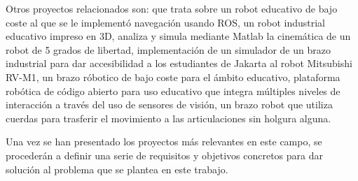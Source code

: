 Otros proyectos relacionados son: \cite{8215317} que trata sobre un robot educativo de bajo coste al que se le implementó navegación usando ROS, 
\cite{vujivcicrealization} un robot industrial educativo impreso en 3D, \cite{Sabri_2021} analiza y simula mediante Matlab la cinemática de un robot 
de 5 grados de libertad, \cite{Prabowo_2019} implementación de un simulador de un brazo industrial para dar accesibilidad a los estudiantes de Jakarta 
al robot Mitsubishi RV-M1, \cite{6235428} un brazo róbotico de bajo coste para el ámbito educativo, \cite{10.1007/978-3-319-62875-2_22} plataforma robótica 
de código abierto para uso educativo que integra múltiples niveles de interacción a través del uso de sensores de visión, \cite{Morgan_2011} un 
brazo robot que utiliza cuerdas para trasferir el movimiento a las articulaciones sin holgura alguna.
\vspace{2cm}

\noindent Una vez se han presentado los proyectos más relevantes en este campo, se procederán a definir una serie 
de requisitos y objetivos concretos para dar solución al problema que se plantea en este trabajo.
